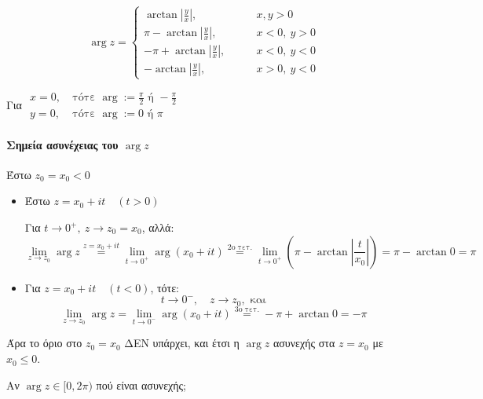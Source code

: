 \documentclass[12pt,a4paper,notitlepage,fleqn]{article}
\begin{document}
    \[
    \arg z = \begin{cases}
    \arctan\left|\frac{y}{x}\right|, \qquad & x,y>0 \\
    \pi - \arctan\left|\frac{y}{x}\right|, \qquad & x<0,\ y>0 \\
    -\pi + \arctan\left|\frac{y}{x}\right|, \qquad & x<0,\ y<0 \\
    -\arctan\left|\frac{y}{x}\right|, \qquad & x>0,\ y<0
    \end{cases}
    \]

    Για \(
    \begin{array}{ll}
    x=0,\ & \text{τότε } \arg := \frac{\pi}{2} \text{ ή } -\frac{\pi}{2}\\
    y=0,\ & \text{τότε } \arg := 0\text{ ή }\pi
    \end{array}
     \)
     
    \paragraph{Σημεία ασυνέχειας του \( \arg z \)} \hspace{0pt}

    Έστω \( z_0 = x_0 < 0 \)
    \begin{itemize}
    	\item Έστω \( z = x_0+it \quad (t>0) \)

    	Για \( t\to0^+,\ z\to z_0=x_0 \), αλλά:
    	\[
    	\lim_{z\to z_0}\arg z \overset{z=x_0+it}{=}
    	\lim_{t\to0^+} \arg(x_0+it) \overset{\text{2ο τετ.}}{=}
    	\lim_{t\to0^+}\left(\pi-\arctan\left|\frac{t}{x_0}\right|\right)
    	=\pi-\arctan0=\pi
    	\]
    	\item Για \( z=x_0+it \quad (t<0) \), τότε:
    	\[
    	t\to0^-,\quad z\to z_0,\text{ και}
    	\]
    	\[
    	\lim_{z\to z_0}\arg z = \lim_{t\to0^-} \arg(x_0+it)
    	\overset{\text{3ο τετ.}}{=} -\pi+\arctan0 = -\pi
    	\]
    \end{itemize}
    Άρα το όριο στο \( z_0=x_0 \) ΔΕΝ υπάρχει, και έτσι η \( \arg z \)
    ασυνεχής στα \( z=x_0 \) με \( x_0\leq 0 \).

    Αν \( \arg z \in [0,2\pi) \) πού είναι ασυνεχής;
\end{document}
